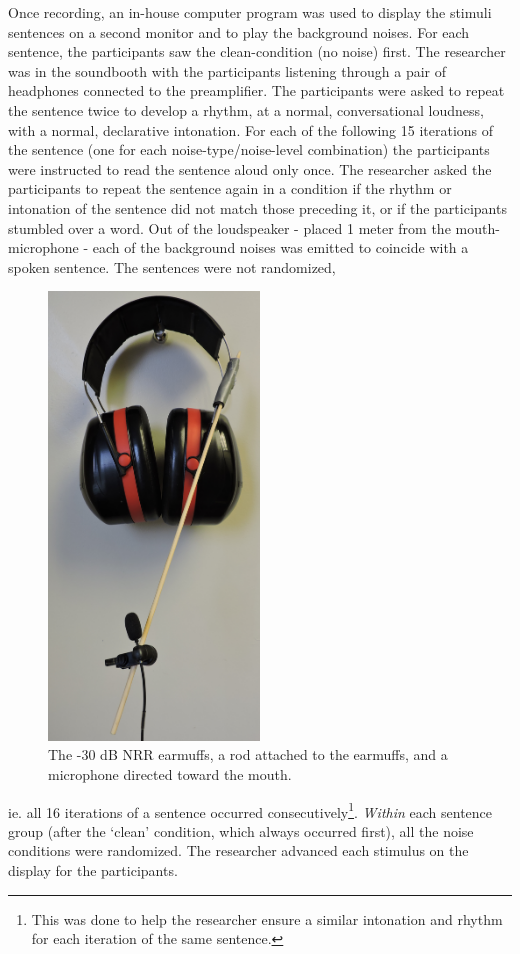 Once recording, an in-house computer program was used to display the stimuli sentences on a second monitor and to play the background noises.  For each sentence, the participants saw the clean-condition (no noise) first.  The researcher was in the soundbooth with the participants listening through a pair of headphones connected to the preamplifier.  
The participants were asked to repeat the sentence twice to develop a rhythm, at a normal, conversational loudness, with a normal, declarative intonation.  For each of the following 15 iterations of the sentence (one for each noise-type/noise-level combination) the participants were instructed to read the sentence aloud only once.  The researcher asked the participants to repeat the sentence again in a condition if the rhythm or intonation of the sentence did not match those preceding it, or if the participants stumbled over a word.  Out of the loudspeaker - placed 1 meter from the mouth-microphone - each of the background noises was emitted to coincide with a spoken sentence.  The sentences were not randomized, 
%
\begin{figure}
\includegraphics[width=0.5\textwidth]{figure/earmuffSetup.JPG}
\caption{The -30 dB NRR earmuffs, a rod attached to the earmuffs, and a microphone directed toward the mouth.}
\label{fig:earmuffSetup}
\end{figure}
%
ie. all 16 iterations of a sentence occurred consecutively\footnote{This was done to help the researcher ensure a similar intonation and rhythm for each iteration of the same sentence.}. \textit{Within} each sentence group (after the `clean' condition, which always occurred first), all the noise conditions were randomized. The researcher advanced each stimulus on the display for the participants.

